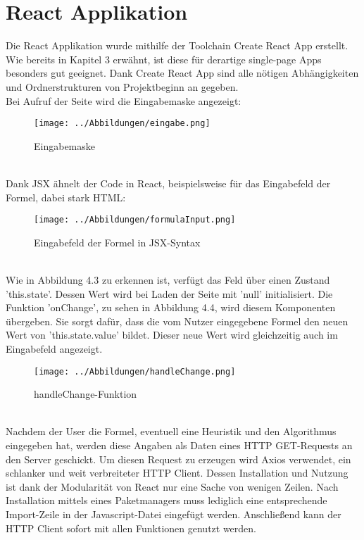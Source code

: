 \section{React Applikation}
Die React Applikation wurde mithilfe der Toolchain Create React App erstellt. Wie bereits in Kapitel 3 erwähnt, ist diese für derartige single-page Apps besonders gut geeignet. Dank Create React App sind alle nötigen Abhängigkeiten und Ordnerstrukturen von Projektbeginn an gegeben. \\
Bei Aufruf der Seite wird die Eingabemaske angezeigt:\\
\begin{figure}[htb]
     \centerline{\texttt{[image: ../Abbildungen/eingabe.png]}}
  \caption{Eingabemaske}
  \label{fig1_1}
\end{figure}\\
Dank JSX ähnelt der Code in React, beispielsweise für das Eingabefeld der Formel, dabei stark HTML:\\
\begin{figure}[htb]
     \centerline{\texttt{[image: ../Abbildungen/formulaInput.png]}}
  \caption{Eingabefeld der Formel in JSX-Syntax}
  \label{fig1_1}
\end{figure}\\
Wie in Abbildung 4.3 zu erkennen ist, verfügt das Feld über einen Zustand 'this.state'. Dessen Wert wird bei Laden der Seite mit 'null' initialisiert. Die Funktion 'onChange', zu sehen in Abbildung 4.4, wird diesem Komponenten übergeben. Sie sorgt dafür, dass die vom Nutzer eingegebene Formel den neuen Wert von 'this.state.value' bildet. Dieser neue Wert wird gleichzeitig auch im Eingabefeld angezeigt.\\
\begin{figure}[htb]
     \centerline{\texttt{[image: ../Abbildungen/handleChange.png]}}
  \caption{handleChange-Funktion}
  \label{fig1_1}
\end{figure}\\
Nachdem der User die Formel, eventuell eine Heuristik und den Algorithmus eingegeben hat, werden diese Angaben als Daten eines HTTP GET-Requests an den Server geschickt. Um diesen Request zu erzeugen wird Axios verwendet, ein schlanker und weit verbreiteter HTTP Client.
Dessen Installation und Nutzung ist dank der Modularität von React nur eine Sache von wenigen Zeilen. Nach Installation mittels eines Paketmanagers muss lediglich eine entsprechende Import-Zeile in der Javascript-Datei eingefügt werden. Anschließend kann der HTTP Client sofort mit allen Funktionen genutzt werden. \\
